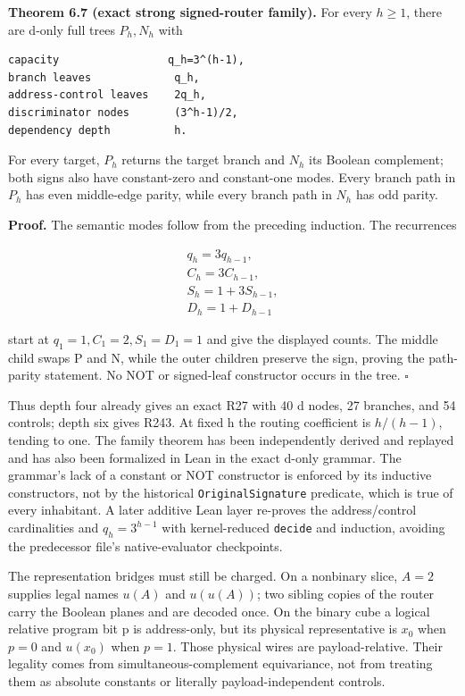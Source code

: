 \documentclass[
  11pt,
]{article}
\newcommand{\passthrough}[1]{#1}
\theoremstyle{definition}
\theoremstyle{remark}
\begin{document}
\textbf{Theorem 6.7 (exact strong signed-router family).} For every
\(h\ge 1\), there are d-only full trees \(P_h,N_h\) with

\begin{lstlisting}
capacity                 q_h=3^(h-1),
branch leaves             q_h,
address-control leaves    2q_h,
discriminator nodes       (3^h-1)/2,
dependency depth          h.
\end{lstlisting}

For every target, \(P_h\) returns the target branch and \(N_h\) its
Boolean complement; both signs also have constant-zero and constant-one
modes. Every branch path in \(P_h\) has even middle-edge parity, while
every branch path in \(N_h\) has odd parity.

\textbf{Proof.} The semantic modes follow from the preceding induction.
The recurrences

\[
\begin{aligned}
q_h=3q_{h-1}, \\
C_h=3C_{h-1}, \\
S_h=1+3S_{h-1}, \\
D_h=1+D_{h-1}
\end{aligned}
\]

start at \(q_1=1,C_1=2,S_1=D_1=1\) and give the displayed counts. The
middle child swaps P and N, while the outer children preserve the sign,
proving the path-parity statement. No NOT or signed-leaf constructor
occurs in the tree. \(\square\)

Thus depth four already gives an exact R27 with 40 d nodes, 27 branches,
and 54 controls; depth six gives R243. At fixed h the routing
coefficient is \(h/(h-1)\), tending to one. The family theorem has been
independently derived and replayed and has also been formalized in Lean
in the exact d-only grammar. The grammar's lack of a constant or NOT
constructor is enforced by its inductive constructors, not by the
historical \passthrough{\lstinline!OriginalSignature!} predicate, which
is true of every inhabitant. A later additive Lean layer re-proves the
address/control cardinalities and \(q_h=3^{h-1}\) with kernel-reduced
\passthrough{\lstinline!decide!} and induction, avoiding the predecessor
file's native-evaluator checkpoints.

The representation bridges must still be charged. On a nonbinary slice,
\(A=2\) supplies legal names \(u(A)\) and \(u(u(A))\); two sibling
copies of the router carry the Boolean planes and are decoded once. On
the binary cube a logical relative program bit p is address-only, but
its physical representative is \(x_0\) when \(p=0\) and \(u(x_0)\) when
\(p=1\). Those physical wires are payload-relative. Their legality comes
from simultaneous-complement equivariance, not from treating them as
absolute constants or literally payload-independent controls.
\end{document}

